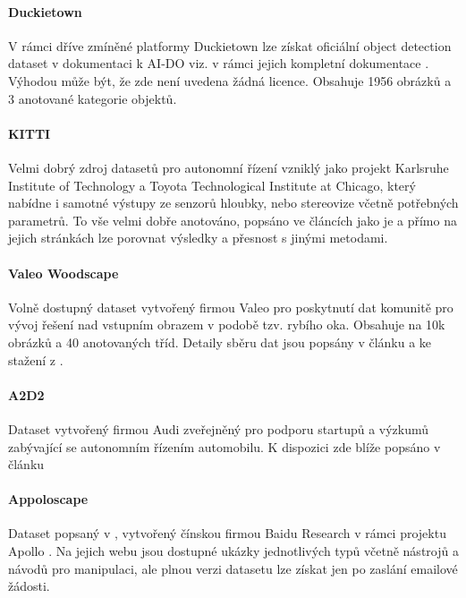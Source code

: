 \documentclass[czech, bc, kky, he, iso690numb]{fasthesis}
\begin{document}
    		\paragraph{Duckietown}
    			V rámci dříve zmíněné platformy Duckietown \cite{Duckietown} lze získat oficiální object detection dataset v dokumentaci k AI-DO viz. \cite{dataset_duckietown} v rámci jejich kompletní dokumentace \cite{duckietown_documentation}. Výhodou může být, že zde není uvedena žádná licence. Obsahuje 1956 obrázků a 3 anotované kategorie objektů.
    			
    		\paragraph{KITTI}
    			Velmi dobrý zdroj datasetů pro autonomní řízení vzniklý jako projekt Karlsruhe Institute of Technology a Toyota Technological Institute at Chicago, který nabídne i samotné výstupy ze senzorů hloubky, nebo stereovize včetně potřebných parametrů. To vše velmi dobře anotováno, popsáno ve článcích jako je \cite{dataset_KITTI_road} a přímo na jejich stránkách \cite{dataset_KITTI_web} lze porovnat výsledky a přesnost s jinými metodami.
    			
    		\paragraph{Valeo Woodscape}
    			Volně dostupný dataset vytvořený firmou Valeo pro poskytnutí dat komunitě pro vývoj řešení nad vstupním obrazem v podobě tzv. rybího oka. Obsahuje na 10k obrázků a 40 anotovaných tříd. Detaily sběru dat jsou popsány v článku \cite{woodscape} a ke stažení z \cite{dataset_woodscape}.
    			
    		\paragraph{A2D2}
    			Dataset vytvořený firmou Audi zveřejněný pro podporu startupů a výzkumů zabývající se autonomním řízením automobilu. K dispozici zde \cite{dataset_A2D2} blíže popsáno v článku \cite{a2d2}
    			
    		\paragraph{Appoloscape}
    			Dataset popsaný v \cite{dataset_ApolloScape_paper}, vytvořený čínskou firmou Baidu Research v rámci projektu Apollo \cite{Apollo}. Na jejich webu \cite{dataset_ApolloScape} jsou dostupné ukázky jednotlivých typů včetně nástrojů a návodů pro manipulaci, ale plnou verzi datasetu lze získat jen po zaslání emailové žádosti.
    			
\end{document}
